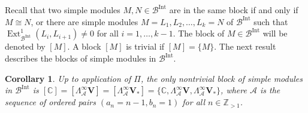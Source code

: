 \documentclass[12pt]{amsart}
\newcommand\C{\mathbb{C}}
\newcommand\Z{\mathbb{Z}}
\newcommand\cA{\mathcal{A}}
\newcommand\cB{\mathcal{B}}
\newcommand\bV{\mathbf{V}}
\DeclareMathOperator{\Ext}{Ext}
\DeclareMathOperator{\Int}{Int}
\theoremstyle{plain}
\newtheorem{cor}[theo]{Corollary}
\theoremstyle{definition}
\numberwithin{equation}{section}
\begin{document}
Recall that two simple modules $M,N\in \cB^{\Int}$ are in the same block if and only if $M\cong N$, or there are simple modules $M=L_1, L_2, \ldots, L_k=N$ of $\cB^{\Int}$ such that $\Ext_{\cB^{\Int}}^1(L_i, L_{i+1})\neq 0$ for all $i=1,\ldots, k-1$. The block of $M\in \cB^{\Int}$ will be denoted by $[M]$. A block $[M]$ is trivial if $[M]=\{M\}$. The next result describes the blocks of simple modules in $\cB^{\Int}$.

\begin{cor}\label{cor:blocks_sl(infty|1)}
Up to application of $\Pi$, the only nontrivial block of simple modules in $\cB^{\Int}$ is $[\C] = [\Lambda_\cA^\infty \bV] = [\Lambda_\cA^\infty \bV_*] = \{\C, \Lambda_\cA^\infty \bV, \Lambda_\cA^\infty \bV_*\}$, where $\cA $ is the sequence of ordered pairs $(a_n = n-1, b_n = 1)$ for all $n\in \Z_{>1}$.
\end{cor}
\end{document}
